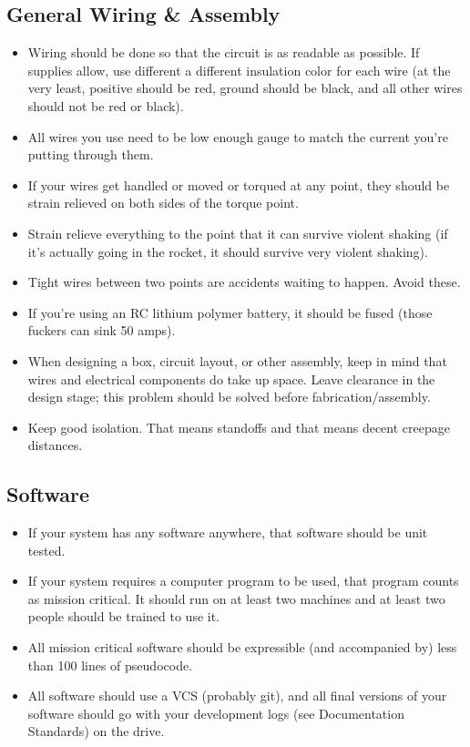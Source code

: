 \documentclass{article}
\begin{document}
\subsection{General Wiring \& Assembly}
\begin{itemize}
\item Wiring should be done so that the circuit is as readable as possible. If supplies allow, use different a different insulation color for each wire (at the very least, positive should be red, ground should be black, and all other wires should not be red or black).
\item All wires you use need to be low enough gauge to match the current you're putting through them.
\item If your wires get handled or moved or torqued at any point, they should be strain relieved on both sides of the torque point.
\item Strain relieve everything to the point that it can survive violent shaking (if it's actually going in the rocket, it should survive very violent shaking).
\item Tight wires between two points are accidents waiting to happen. Avoid these.
\item If you're using an RC lithium polymer battery, it should be fused (those fuckers can sink 50 amps).
\item When designing a box, circuit layout, or other assembly, keep in mind that wires and electrical components do take up space. Leave clearance in the design stage; this problem should be solved before fabrication/assembly.
\item Keep good isolation. That means standoffs and that means decent creepage distances.
\end{itemize}

\subsection{Software}
\begin{itemize}
\item If your system has any software anywhere, that software should be unit tested.
\item If your system requires a computer program to be used, that program counts as mission critical. It should run on at least two machines and at least two people should be trained to use it.
\item All mission critical software should be expressible (and accompanied by) less than 100 lines of pseudocode.
\item All software should use a VCS (probably git), and all final versions of your software should go with your development logs (see Documentation Standards) on the drive.
\end{itemize}
\end{document}
